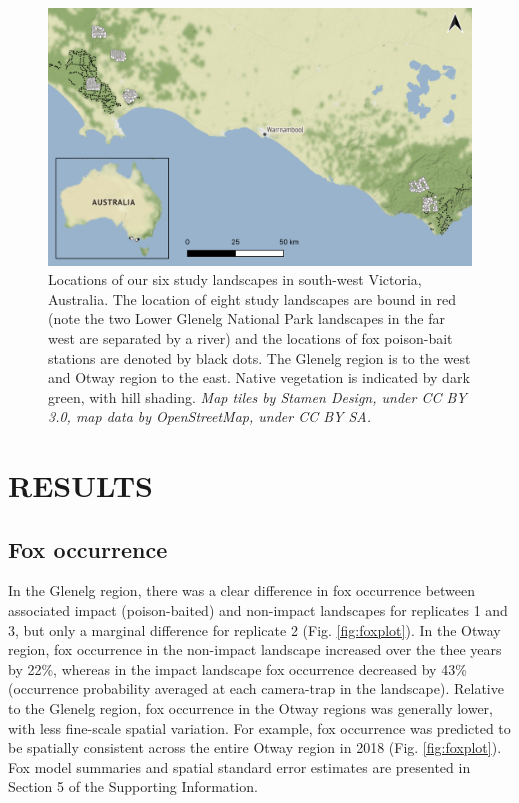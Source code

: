\documentclass[]{elsarticle} %
\begin{document}
\begin{figure}
\includegraphics[width=1\linewidth]{figs/fig1} \caption{Locations of our six study landscapes in south-west Victoria, Australia. The location of eight study landscapes are bound in red (note the two Lower Glenelg National Park landscapes in the far west are separated by a river) and the locations of fox poison-bait stations are denoted by black dots. The Glenelg region is to the west and Otway region to the east. Native vegetation is indicated by dark green, with hill shading. \textit{Map tiles by Stamen Design, under CC BY 3.0, map data by OpenStreetMap, under CC BY SA.}}\label{fig:map}
\end{figure}

\newpage

\hypertarget{results}{%
\section{RESULTS}\label{results}}

\hypertarget{fox-occurrence}{%
\subsection{Fox occurrence}\label{fox-occurrence}}

In the Glenelg region, there was a clear difference in fox occurrence between associated impact (poison-baited) and non-impact landscapes for replicates 1 and 3, but only a marginal difference for replicate 2 (Fig. \ref{fig:foxplot}). In the Otway region, fox occurrence in the non-impact landscape increased over the thee years by 22\%, whereas in the impact landscape fox occurrence decreased by 43\% (occurrence probability averaged at each camera-trap in the landscape). Relative to the Glenelg region, fox occurrence in the Otway regions was generally lower, with less fine-scale spatial variation. For example, fox occurrence was predicted to be spatially consistent across the entire Otway region in 2018 (Fig. \ref{fig:foxplot}). Fox model summaries and spatial standard error estimates are presented in Section 5 of the Supporting Information.
\end{document}
